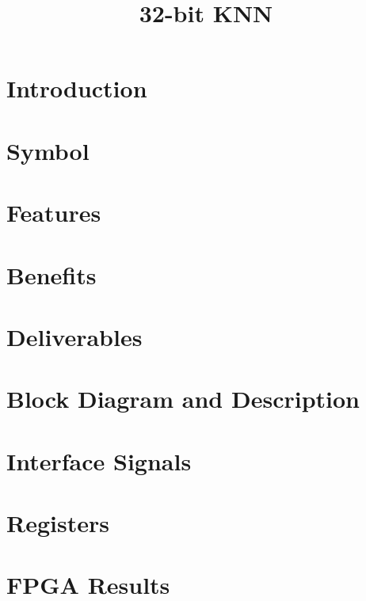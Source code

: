 \documentclass{../../submodules/TEX/document/ug/ug}
\title{32-bit KNN}
\begin{document}
\maketitle
\cleardoublepage
\tableofcontents
\listoftables
\listoffigures
\cleardoublepage

\section{Introduction}


\section{Symbol}


\section{\textcolor[rgb]{0,0,0}{Features}}

\clearpage

\section{\textcolor[rgb]{0,0,0}{Benefits}}


\section{\textcolor[rgb]{0,0,0}{Deliverables}}

\clearpage

\section{\textcolor[rgb]{0,0,0}{Block Diagram and Description}}

\clearpage

%

\section{Interface Signals}


\section{Registers}


\section{\textcolor[rgb]{0,0,0}{FPGA Results}}


%
%
\end{document}
